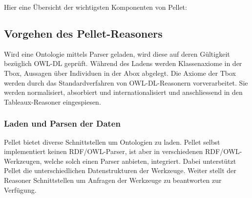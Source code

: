 Hier eine Übersicht der wichtigsten Komponenten von Pellet:
\begin{table}[H]
\centering
{}\hfill
{}
\end{table}


\subsection{Vorgehen des Pellet-Reasoners}
\label{subsection:inferenz_pellet_vorgehen}
Wird eine Ontologie mittels Parser geladen, wird diese auf deren Gültigkeit bezüglich OWL-DL geprüft. Während des Ladens werden Klassenaxiome in der Tbox, Aussagen über Individuen in der Abox abgelegt. Die Axiome der Tbox werden durch das Standardverfahren von OWL-DL-Reasonern vorverarbeitet. Sie werden normalisiert, absorbiert und internationalisiert und anschliessend in den Tableaux-Reasoner eingespiesen.

\subsubsection{Laden und Parsen der Daten}
\label{ssubsection:inferenz_pellet_parsing}
Pellet bietet diverse Schnittstellen um Ontologien zu laden. Pellet selbst implementiert keinen RDF/OWL-Parser, ist aber in verschiedenen RDF/OWL-Werkzeugen, welche solch einen Parser anbieten, integriert. Dabei unterstützt Pellet die unterschiedlichen Datenstrukturen der Werkzeuge. Weiter stellt der Reasoner Schnittstellen um Anfragen der Werkzeuge zu beantworten zur Verfügung.

